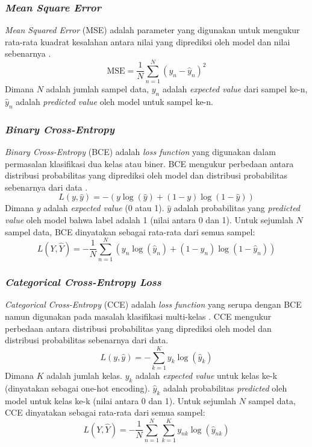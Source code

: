 \subsubsection{\textit{Mean Square Error}}

\textit{Mean Squared Error} (MSE) adalah parameter yang digunakan untuk mengukur rata-rata kuadrat kesalahan antara nilai yang diprediksi oleh model dan nilai sebenarnya \cite{GoodBengCour16}. 
\begin{equation}
    \text{MSE} = \frac{1}{N} \sum_{n=1}^{N} (y_n - \hat{y}_n)^2
    \label{eq:MSE}
\end{equation}
Dimana \(N\) adalah jumlah sampel data, \(y_n\) adalah \textit{expected value} dari sampel ke-n, \(\hat{y}_n\) adalah \textit{predicted value} oleh model untuk sampel ke-n.

\subsubsection{\textit{Binary Cross-Entropy}}

\textit{Binary Cross-Entropy} (BCE) adalah \textit{loss function} yang digunakan dalam permasalan klasifikasi dua kelas atau biner. BCE mengukur perbedaan antara distribusi probabilitas yang diprediksi oleh model dan distribusi probabilitas sebenarnya dari data \cite{bishop_2006}.
\begin{equation}
    L(y, \hat{y}) = - \left( y \log(\hat{y}) + (1 - y) \log(1 - \hat{y}) \right)
\end{equation}
Dimana \(y\) adalah \textit{expected value} (0 atau 1). \(\hat{y}\) adalah probabilitas yang \textit{predicted value} oleh model bahwa label adalah 1 (nilai antara 0 dan 1). Untuk sejumlah \(N\) sampel data, BCE dinyatakan sebagai rata-rata dari semua sampel:
\begin{equation}
    L(Y, \hat{Y}) = - \frac{1}{N} \sum_{n=1}^{N} \left( y_n \log(\hat{y}_n) + (1 - y_n) \log(1 - \hat{y}_n) \right)
\end{equation}

\subsubsection{\textit{Categorical Cross-Entropy Loss}}

\textit{Categorical Cross-Entropy} (CCE) adalah \textit{loss function} yang serupa dengan BCE namun digunakan pada masalah klasifikasi multi-kelas \cite{GoodBengCour16}. CCE mengukur perbedaan antara distribusi probabilitas yang diprediksi oleh model dan distribusi probabilitas sebenarnya dari data.
\begin{equation}
    L(y, \hat{y}) = - \sum_{k=1}^{K} y_k \log(\hat{y}_k)
\end{equation}
Dimana \(K\) adalah jumlah kelas. \(y_k\) adalah \textit{expected value} untuk kelas ke-k (dinyatakan sebagai one-hot encoding). \(\hat{y}_k\) adalah probabilitas \textit{predicted} oleh model untuk kelas ke-k (nilai antara 0 dan 1). Untuk sejumlah \(N\) sampel data, CCE dinyatakan sebagai rata-rata dari semua sampel:
\begin{equation}
    L(Y, \hat{Y}) = - \frac{1}{N} \sum_{n=1}^{N} \sum_{k=1}^{K} y_{nk} \log(\hat{y}_{nk})
\end{equation}


